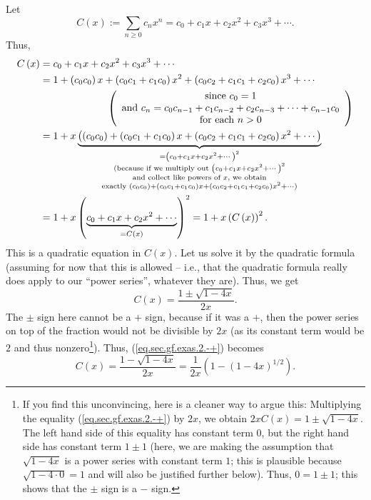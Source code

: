 Let%
\[
C\left(  x\right)  :=\sum_{n\geq0}c_{n}x^{n}=c_{0}+c_{1}x+c_{2}x^{2}%
+c_{3}x^{3}+\cdots.
\]
Thus,%
\begin{align*}
C\left(  x\right)   &  =c_{0}+c_{1}x+c_{2}x^{2}+c_{3}x^{3}+\cdots\\
&  =1+\left(  c_{0}c_{0}\right)  x+\left(  c_{0}c_{1}+c_{1}c_{0}\right)
x^{2}+\left(  c_{0}c_{2}+c_{1}c_{1}+c_{2}c_{0}\right)  x^{3}+\cdots\\
&  \ \ \ \ \ \ \ \ \ \ \ \ \ \ \ \ \ \ \ \ \left(
\begin{array}
[c]{c}%
\text{since }c_{0}=1\\
\text{and }c_{n}=c_{0}c_{n-1}+c_{1}c_{n-2}+c_{2}c_{n-3}+\cdots+c_{n-1}c_{0}\\
\text{for each }n>0
\end{array}
\right) \\
&  =1+x\underbrace{\left(  \left(  c_{0}c_{0}\right)  +\left(  c_{0}%
c_{1}+c_{1}c_{0}\right)  x+\left(  c_{0}c_{2}+c_{1}c_{1}+c_{2}c_{0}\right)
x^{2}+\cdots\right)  }_{\substack{=\left(  c_{0}+c_{1}x+c_{2}x^{2}%
+\cdots\right)  ^{2}\\\text{(because if we multiply out }\left(  c_{0}%
+c_{1}x+c_{2}x^{2}+\cdots\right)  ^{2}\\\text{and collect like powers of
}x\text{, we obtain}\\\text{exactly }\left(  c_{0}c_{0}\right)  +\left(
c_{0}c_{1}+c_{1}c_{0}\right)  x+\left(  c_{0}c_{2}+c_{1}c_{1}+c_{2}%
c_{0}\right)  x^{2}+\cdots\text{)}}}\\
&  =1+x\left(  \underbrace{c_{0}+c_{1}x+c_{2}x^{2}+\cdots}_{=C\left(
x\right)  }\right)  ^{2}=1+x\left(  C\left(  x\right)  \right)  ^{2}.
\end{align*}
This is a quadratic equation in $C\left(  x\right)  $. Let us solve it by the
quadratic formula (assuming for now that this is allowed -- i.e., that the
quadratic formula really does apply to our \textquotedblleft power
series\textquotedblright, whatever they are). Thus, we get%
\begin{equation}
C\left(  x\right)  =\dfrac{1\pm\sqrt{1-4x}}{2x}. \label{eq.sec.gf.exas.2.-+}%
\end{equation}
The $\pm$ sign here cannot be a $+$ sign, because if it was a $+$, then the
power series on top of the fraction would not be divisible by $2x$ (as its
constant term would be $2$ and thus nonzero\footnote{If you find this
unconvincing, here is a cleaner way to argue this: Multiplying the equality
(\ref{eq.sec.gf.exas.2.-+}) by $2x$, we obtain $2xC\left(  x\right)
=1\pm\sqrt{1-4x}$. The left hand side of this equality has constant term $0$,
but the right hand side has constant term $1\pm1$ (here, we are making the
assumption that $\sqrt{1-4x}$ is a power series with constant term $1$; this
is plausible because $\sqrt{1-4\cdot0}=1$ and will also be justified further
below). Thus, $0=1\pm1$; this shows that the $\pm$ sign is a $-$ sign.}).
Thus, (\ref{eq.sec.gf.exas.2.-+}) becomes%
\begin{equation}
C\left(  x\right)  =\dfrac{1-\sqrt{1-4x}}{2x}=\dfrac{1}{2x}\left(  1-\left(
1-4x\right)  ^{1/2}\right)  . \label{eq.sec.gf.exas.2.-}%
\end{equation}


